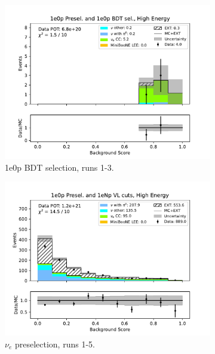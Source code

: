 \begin{figure}[H]
\begin{subfigure}{0.33\linewidth}
    \includegraphics[width=\linewidth]{technote/Sidebands/Figures/FarSideband/far_sideband_bkg_score_run123_ZP_ZPBDT_HIGH_ENERGY.pdf}
    \caption{1e0p BDT selection, runs 1-3.}
    \end{subfigure}
    \begin{subfigure}{0.33\linewidth}
    \includegraphics[width=\linewidth]{technote/Sidebands/Figures/FarSideband/far_sideband_bkg_score_run1234a4b4c4d5_ZP_ZP_HIGH_ENERGY.pdf}
    \caption{$\nu_e$ preselection, runs 1-5.}
    \end{subfigure}%
    \begin{subfigure}{0.33\linewidth}

\end{subfigure}
\end{figure}
